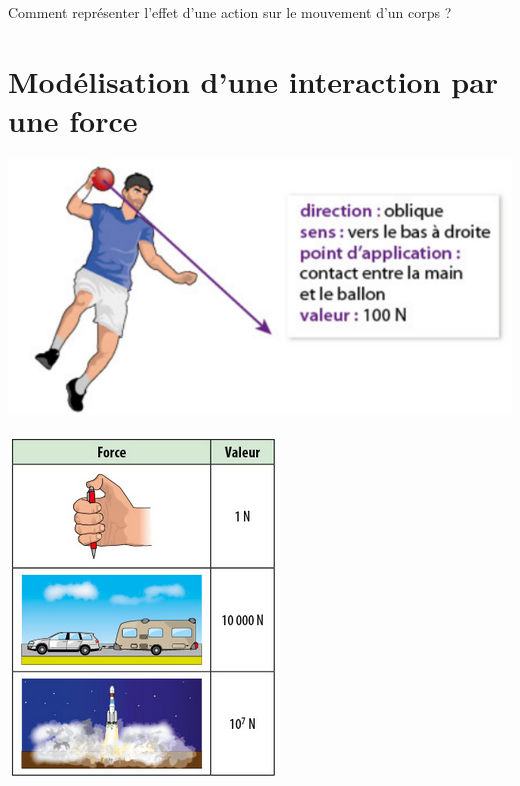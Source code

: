 \documentclass[12pt,a4paper]{article}
\date{}
\title{}
\begin{document}
	
	


\begin{mypb}
	\begin{center}
		{\Large Comment représenter l'effet d'une action sur le mouvement d'un corps ?}
	\end{center}
\end{mypb}

\section{Modélisation d'une interaction par une force}






\begin{multicols}{2}
	\begin{center}
		\includegraphics[scale=0.5]{ex_force}
	\end{center}

	\begin{center}
		\includegraphics[scale=0.5]{og_valeurs}
	\end{center}
\end{multicols}
\end{document}
